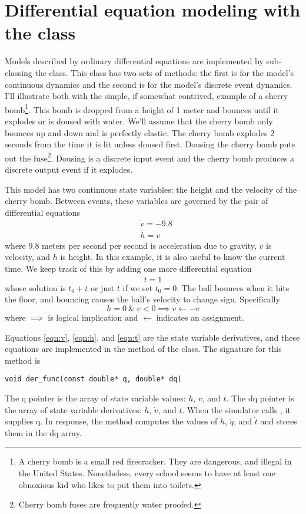 \section{Differential equation modeling with the  class}
Models described by ordinary differential equations are implemented by sub-classing the  class. This class has two sets of methods: the first is for the model's continuous dynamics and the second is for the model's discrete event dynamics. I'll illustrate both with the simple, if somewhat contrived, example of a cherry bomb\footnote{A cherry bomb is a small red firecracker. They are dangerous, and illegal in the United States. Nonetheless, every school seems to have at least one obnoxious kid who likes to put them into toilets.}. This bomb is dropped from a height of 1 meter and bounces until it explodes or is doused with water. We'll assume that the cherry bomb only bounces up and down and is perfectly elastic. The cherry bomb explodes 2 seconds from the time it is lit unless doused first. Dousing the cherry bomb puts out the fuse\footnote{Cherry bomb fuses are frequently water proofed.}. Dousing is a discrete input event and the cherry bomb produces a discrete output event if it explodes. 

This model has two continuous state variables: the height and the velocity of the cherry bomb. Between events, these variables are governed by the pair of differential equations
\begin{align}
&\dot{v} = -9.8 \label{eqn:v} \\
&\dot{h} = v \label{eqn:h}
\end{align}
where $9.8$ meters per second per second is acceleration due to gravity, $v$ is velocity, and $h$ is height. In this example, it is also useful to know the current time. We keep track of this by adding one more differential equation
\begin{equation}
\dot{t} = 1 \label{eqn:t}
\end{equation}
whose solution is $t_0 + t$ or just $t$ if we set $t_0 = 0$. The ball bounces when it hits the floor, and bouncing causes the ball's velocity to change sign. Specifically
\begin{equation}
h = 0 \ \& \ v < 0 \implies v \leftarrow -v \label{eqn:state_event}
\end{equation}
where $\implies$ is logical implication and $\leftarrow$ indicates an assignment. 

Equations \ref{eqn:v}, \ref{eqn:h}, and \ref{eqn:t} are the state variable derivatives, and these equations are implemented in the  method of the  class. The signature for this method is
\begin{verbatim}
void der_func(const double* q, double* dq)
\end{verbatim}
The q pointer is the array of state variable values: $h$, $v$, and $t$. The dq pointer is the array of state variable derivatives: $\dot{h}$, $\dot{v}$, and $\dot{t}$. When the simulator calls , it supplies q. In response, the method computes the values of $\dot{h}$, $\dot{q}$, and $\dot{t}$ and stores them in the dq array.

